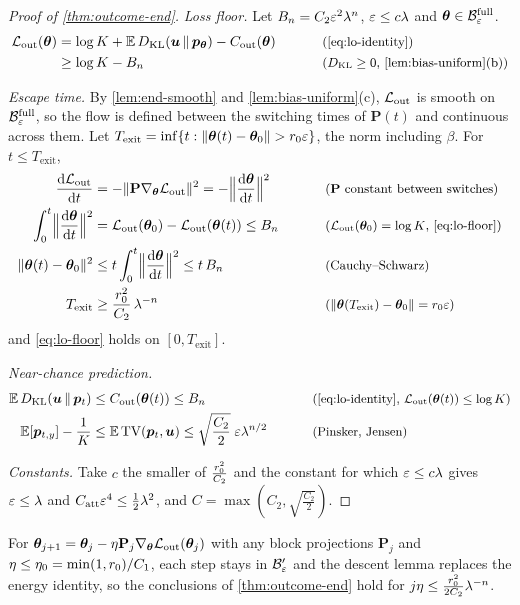 \begin{proof}[Proof of \cref{thm:outcome-end}]
\emph{Loss floor.} Let $B_n=C_2\varepsilon^2\lambda^n$, $\varepsilon\le c\lambda$ and $\bm\theta\in\mathcal B^{\mathrm{full}}_{\varepsilon}$.
\begin{alignat}{2}
 \Lout(\bm\theta)&=\log K+\E\,\KL(\bm u\,\|\,\bm p_{\bm\theta})-\outcredit(\bm\theta) &\qquad& \why{\cref{eq:lo-identity}}\nonumber\\
 &\ge\log K-B_n && \why{$\KL\ge0$, \cref{lem:bias-uniform}(b)}\label{eq:lo-floor}
\end{alignat}

\emph{Escape time.} By \cref{lem:end-smooth} and \cref{lem:bias-uniform}(c), $\mathcal L_{\mathrm{out}}$ is smooth on $\mathcal B^{\mathrm{full}}_{\varepsilon}$, so the flow is defined between the
switching times of $\mathbf P(t)$ and continuous across them. Let $T_{\mathrm{exit}}=\inf\{t:\|\bm\theta(t)-\bm\theta_0\|>\ballradius\initscale\}$, the norm
including $\beta$. For $t\le T_{\mathrm{exit}}$,
\begin{alignat*}{2}
 \ddt{\Lout}&=-\|\mathbf P\nabla_{\bm\theta}\Lout\|^2=-\Bigl\|\ddt{\bm\theta}\Bigr\|^2 &\qquad& \why{$\mathbf P$ constant between switches}\\
 \int_0^t\Bigl\|\ddt{\bm\theta}\Bigr\|^2&=\Lout(\bm\theta_0)-\Lout(\bm\theta(t))\le B_n && \why{$\Lout(\bm\theta_0)=\log K$, \cref{eq:lo-floor}}\\
 \|\bm\theta(t)-\bm\theta_0\|^2&\le t\int_0^t\Bigl\|\ddt{\bm\theta}\Bigr\|^2\le t\,B_n && \why{Cauchy--Schwarz}\\
 T_{\mathrm{exit}}&\ge\frac{\ballradius^2}{C_2}\,\mixrate^{-n} && \why{$\|\bm\theta(T_{\mathrm{exit}})-\bm\theta_0\|=\ballradius\initscale$}
\end{alignat*}
and \cref{eq:lo-floor} holds on $[0,T_{\mathrm{exit}}]$.

\emph{Near-chance prediction.}
\begin{alignat*}{2}
 \E\,\KL(\bm u\,\|\,\bm p_t)&\le\outcredit(\bm\theta(t))\le B_n &\qquad& \why{\cref{eq:lo-identity}, $\Lout(\bm\theta(t))\le\log K$}\\
 \E[\bm p_{t,y}]-\tfrac{1}{K}&\le\E\,\mathrm{TV}(\bm p_t,\bm u)\le\sqrt{\frac{C_2}{2}}\;\initscale\mixrate^{n/2} && \why{Pinsker, Jensen}
\end{alignat*}

\emph{Constants.} Take $c$ the smaller of $\frac{r_0^2}{C_2}$ and the constant for which $\varepsilon\le c\lambda$ gives $\varepsilon\le\lambda$ and
$C_{\mathrm{att}}\varepsilon^4\le\frac{1}{2}\lambda^2$, and $C=\max(C_2,\sqrt{\frac{C_2}{2}})$.
\end{proof}
\begin{remark}
\label{rem:flow}
For $\bm\theta_{j+1}=\bm\theta_j-\eta\mathbf P_j\nabla_{\bm\theta}\mathcal L_{\mathrm{out}}(\bm\theta_j)$ with any block projections $\mathbf P_j$ and $\eta\le\eta_0=\min(1,r_0)/C_1$, each step stays in
$\mathcal B_{\varepsilon}'$ and the descent lemma replaces the energy identity, so the conclusions of \cref{thm:outcome-end} hold for $j\eta\le\frac{r_0^2}{2C_2}\lambda^{-n}$.
\end{remark}

